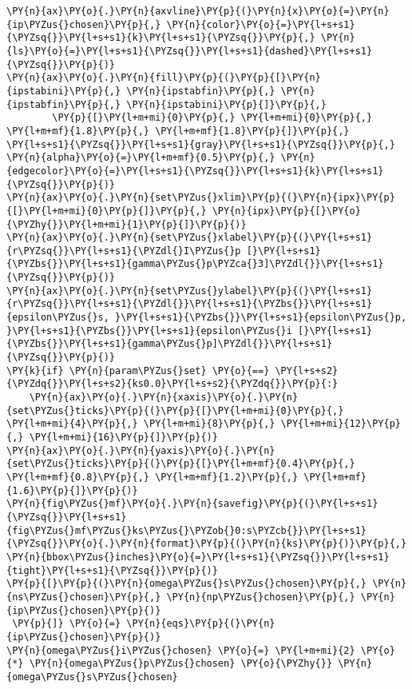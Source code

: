 \begin{Verbatim}[commandchars=\\\{\}]
\PY{n}{ax}\PY{o}{.}\PY{n}{axvline}\PY{p}{(}\PY{n}{x}\PY{o}{=}\PY{n}{ip\PYZus{}chosen}\PY{p}{,} \PY{n}{color}\PY{o}{=}\PY{l+s+s1}{\PYZsq{}}\PY{l+s+s1}{k}\PY{l+s+s1}{\PYZsq{}}\PY{p}{,} \PY{n}{ls}\PY{o}{=}\PY{l+s+s1}{\PYZsq{}}\PY{l+s+s1}{dashed}\PY{l+s+s1}{\PYZsq{}}\PY{p}{)}
\PY{n}{ax}\PY{o}{.}\PY{n}{fill}\PY{p}{(}\PY{p}{[}\PY{n}{ipstabini}\PY{p}{,} \PY{n}{ipstabfin}\PY{p}{,} \PY{n}{ipstabfin}\PY{p}{,} \PY{n}{ipstabini}\PY{p}{]}\PY{p}{,}
        \PY{p}{[}\PY{l+m+mi}{0}\PY{p}{,} \PY{l+m+mi}{0}\PY{p}{,} \PY{l+m+mf}{1.8}\PY{p}{,} \PY{l+m+mf}{1.8}\PY{p}{]}\PY{p}{,} \PY{l+s+s1}{\PYZsq{}}\PY{l+s+s1}{gray}\PY{l+s+s1}{\PYZsq{}}\PY{p}{,} \PY{n}{alpha}\PY{o}{=}\PY{l+m+mf}{0.5}\PY{p}{,} \PY{n}{edgecolor}\PY{o}{=}\PY{l+s+s1}{\PYZsq{}}\PY{l+s+s1}{k}\PY{l+s+s1}{\PYZsq{}}\PY{p}{)}
\PY{n}{ax}\PY{o}{.}\PY{n}{set\PYZus{}xlim}\PY{p}{(}\PY{n}{ipx}\PY{p}{[}\PY{l+m+mi}{0}\PY{p}{]}\PY{p}{,} \PY{n}{ipx}\PY{p}{[}\PY{o}{\PYZhy{}}\PY{l+m+mi}{1}\PY{p}{]}\PY{p}{)}
\PY{n}{ax}\PY{o}{.}\PY{n}{set\PYZus{}xlabel}\PY{p}{(}\PY{l+s+s1}{r\PYZsq{}}\PY{l+s+s1}{\PYZdl{}I\PYZus{}p [}\PY{l+s+s1}{\PYZbs{}}\PY{l+s+s1}{gamma\PYZus{}p\PYZca{}3]\PYZdl{}}\PY{l+s+s1}{\PYZsq{}}\PY{p}{)}
\PY{n}{ax}\PY{o}{.}\PY{n}{set\PYZus{}ylabel}\PY{p}{(}\PY{l+s+s1}{r\PYZsq{}}\PY{l+s+s1}{\PYZdl{}}\PY{l+s+s1}{\PYZbs{}}\PY{l+s+s1}{epsilon\PYZus{}s, }\PY{l+s+s1}{\PYZbs{}}\PY{l+s+s1}{epsilon\PYZus{}p, }\PY{l+s+s1}{\PYZbs{}}\PY{l+s+s1}{epsilon\PYZus{}i [}\PY{l+s+s1}{\PYZbs{}}\PY{l+s+s1}{gamma\PYZus{}p]\PYZdl{}}\PY{l+s+s1}{\PYZsq{}}\PY{p}{)}
\PY{k}{if} \PY{n}{param\PYZus{}set} \PY{o}{==} \PY{l+s+s2}{\PYZdq{}}\PY{l+s+s2}{ks0.0}\PY{l+s+s2}{\PYZdq{}}\PY{p}{:}
    \PY{n}{ax}\PY{o}{.}\PY{n}{xaxis}\PY{o}{.}\PY{n}{set\PYZus{}ticks}\PY{p}{(}\PY{p}{[}\PY{l+m+mi}{0}\PY{p}{,} \PY{l+m+mi}{4}\PY{p}{,} \PY{l+m+mi}{8}\PY{p}{,} \PY{l+m+mi}{12}\PY{p}{,} \PY{l+m+mi}{16}\PY{p}{]}\PY{p}{)}
\PY{n}{ax}\PY{o}{.}\PY{n}{yaxis}\PY{o}{.}\PY{n}{set\PYZus{}ticks}\PY{p}{(}\PY{p}{[}\PY{l+m+mf}{0.4}\PY{p}{,} \PY{l+m+mf}{0.8}\PY{p}{,} \PY{l+m+mf}{1.2}\PY{p}{,} \PY{l+m+mf}{1.6}\PY{p}{]}\PY{p}{)}
\PY{n}{fig\PYZus{}mf}\PY{o}{.}\PY{n}{savefig}\PY{p}{(}\PY{l+s+s1}{\PYZsq{}}\PY{l+s+s1}{fig\PYZus{}mf\PYZus{}ks\PYZus{}\PYZob{}0:s\PYZcb{}}\PY{l+s+s1}{\PYZsq{}}\PY{o}{.}\PY{n}{format}\PY{p}{(}\PY{n}{ks}\PY{p}{)}\PY{p}{,} \PY{n}{bbox\PYZus{}inches}\PY{o}{=}\PY{l+s+s1}{\PYZsq{}}\PY{l+s+s1}{tight}\PY{l+s+s1}{\PYZsq{}}\PY{p}{)}
\PY{p}{[}\PY{p}{(}\PY{n}{omega\PYZus{}s\PYZus{}chosen}\PY{p}{,} \PY{n}{ns\PYZus{}chosen}\PY{p}{,} \PY{n}{np\PYZus{}chosen}\PY{p}{,} \PY{n}{ip\PYZus{}chosen}\PY{p}{)}
 \PY{p}{]} \PY{o}{=} \PY{n}{eqs}\PY{p}{(}\PY{n}{ip\PYZus{}chosen}\PY{p}{)}
\PY{n}{omega\PYZus{}i\PYZus{}chosen} \PY{o}{=} \PY{l+m+mi}{2} \PY{o}{*} \PY{n}{omega\PYZus{}p\PYZus{}chosen} \PY{o}{\PYZhy{}} \PY{n}{omega\PYZus{}s\PYZus{}chosen}

\end{Verbatim}
